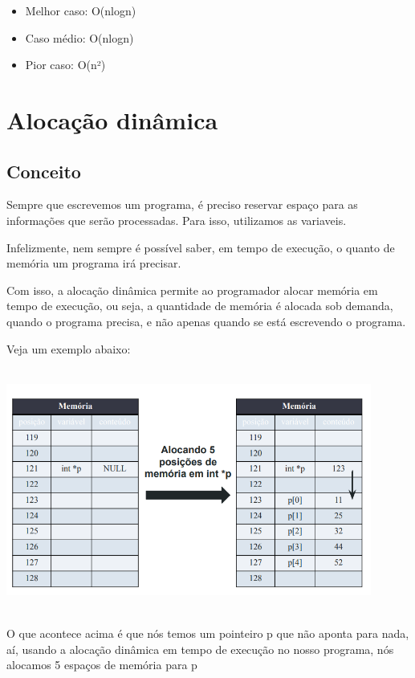 \documentclass{report}
\begin{document}
	\begin{itemize}
		\item Melhor caso: O(nlogn)
		\item Caso médio: O(nlogn)
		\item Pior caso: O(n²)
	\end{itemize} 
	
	\chapter{Alocação dinâmica}
	
	\section{Conceito}
	
	Sempre que escrevemos um programa, é preciso reservar espaço para as informações que serão processadas. Para isso, utilizamos as variaveis.
	
	Infelizmente, nem sempre é possível saber, em tempo de execução, o quanto de memória um
	programa irá precisar. 
	
	Com isso, a alocação dinâmica permite ao programador alocar memória em tempo de execução, ou seja, a quantidade de memória é alocada sob demanda, quando o programa
	precisa, e não apenas quando se
	está escrevendo o programa.
	
	Veja um exemplo abaixo:
	
	\begin{center}
		
		\includegraphics[width=12cm,height=8cm,keepaspectratio=false]{imagens/dynamicaloc.png}
		
	\end{center}
	
	O que acontece acima é que nós temos um pointeiro p que não aponta para nada, aí, usando a alocação dinâmica em tempo de execução no nosso programa, nós alocamos 5 espaços de memória para p
	
\end{document}

